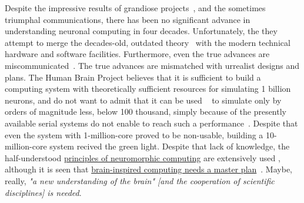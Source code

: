 

%
Despite the impressive results of grandiose projects~\cite{BrainInitiative10:2024,HumanBrainProject:2018}, and the sometimes triumphal communications, there has been no significant advance in understanding neuronal computing in four decades. 
Unfortunately, the they attempt to merge the decades-old, outdated theory~\cite{HBP_HodgkinHuxleyNeuronBuilder:2023} with the modern technical hardware and software facilities.
Furthermore, even the true advances are miscommunicated~\cite{HBP_ScientificAdvances:2023}.
The true advances are mismatched with urrealist designs and plans.
The Human Brain Project believes that it is sufficient to build
a computing system with theoretically sufficient resources for simulating 1 billion neurons, and do not want to admit that it can be used ~\cite{NeuralNetworkPerformance:2018} to simulate only by orders of magnitude less, below 100 thousand, simply because of the presently available serial systems do not enable to reach such a performance~\cite{VeghBrainAmdahl:2019}.
Despite that even the system with 1-million-core proved to be non-usable, building a 10-million-core system recived the green light.
Despite that lack of knowledge, the half-understood
\href{https://www.nature.com/articles/s42254-020-0208-2.pdf}{principles of neuromorphic computing}
are extensively used
\cite{NeuromorphicComputing:2015,PhysicsForNeuromorhicComputing:2020},
although  it is seen that \href{https://www.nature.com/articles/s41586-021-04362-w}{brain-inspired computing needs a master plan}~\cite{BrainMasterPlan:2022}.
Maybe, really, \textit{"a new understanding of the brain" [and the cooperation of scientific disciplines] is needed}.

